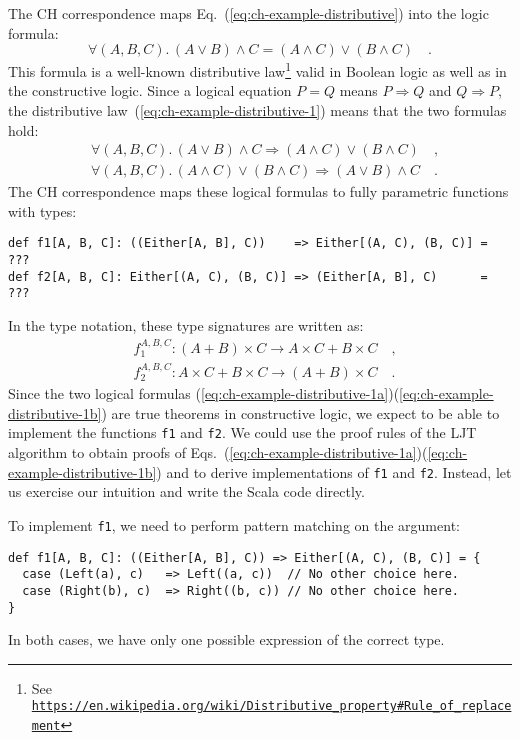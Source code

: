 The CH correspondence maps Eq.~(\ref{eq:ch-example-distributive})
into the logic formula:
\begin{equation}
\forall(A,B,C).\,\left(A\vee B\right)\wedge C=\left(A\wedge C\right)\vee\left(B\wedge C\right)\quad.\label{eq:ch-example-distributive-1}
\end{equation}
This formula is a well-known distributive law\footnote{See \texttt{\href{https://en.wikipedia.org/wiki/Distributive_property\#Rule_of_replacement}{https://en.wikipedia.org/wiki/Distributive\_property\#Rule\_of\_replacement}}}
valid in Boolean logic as well as in the constructive logic. Since
a logical equation $P=Q$ means $P\Rightarrow Q$ and $Q\Rightarrow P$,
the distributive law~(\ref{eq:ch-example-distributive-1}) means
that the two formulas hold:
\begin{align}
 & \forall(A,B,C).\,\left(A\vee B\right)\wedge C\Rightarrow\left(A\wedge C\right)\vee\left(B\wedge C\right)\quad,\label{eq:ch-example-distributive-1a}\\
 & \forall(A,B,C).\,\left(A\wedge C\right)\vee\left(B\wedge C\right)\Rightarrow\left(A\vee B\right)\wedge C\quad.\label{eq:ch-example-distributive-1b}
\end{align}
The CH correspondence maps these logical formulas to fully parametric
functions with types:
\begin{lstlisting}
def f1[A, B, C]: ((Either[A, B], C))    => Either[(A, C), (B, C)] = ???
def f2[A, B, C]: Either[(A, C), (B, C)] => (Either[A, B], C)      = ???
\end{lstlisting}
In the type notation, these type signatures are written as:
\begin{align*}
 & f_{1}^{A,B,C}:\left(A+B\right)\times C\rightarrow A\times C+B\times C\quad,\\
 & f_{2}^{A,B,C}:A\times C+B\times C\rightarrow\left(A+B\right)\times C\quad.
\end{align*}
Since the two logical formulas (\ref{eq:ch-example-distributive-1a})\textendash (\ref{eq:ch-example-distributive-1b})
are true theorems in constructive logic, we expect to be able to implement
the functions \lstinline!f1! and \lstinline!f2!. We could use the
proof rules of the LJT algorithm to obtain proofs of Eqs.~(\ref{eq:ch-example-distributive-1a})\textendash (\ref{eq:ch-example-distributive-1b})
and to derive implementations of \lstinline!f1! and \lstinline!f2!.
Instead, let us exercise our intuition and write the Scala code directly.

To implement \lstinline!f1!, we need to perform pattern matching
on the argument:
\begin{lstlisting}
def f1[A, B, C]: ((Either[A, B], C)) => Either[(A, C), (B, C)] = {
  case (Left(a), c)   => Left((a, c))  // No other choice here.
  case (Right(b), c)  => Right((b, c)) // No other choice here.
}
\end{lstlisting}
In both cases, we have only one possible expression of the correct
type.

